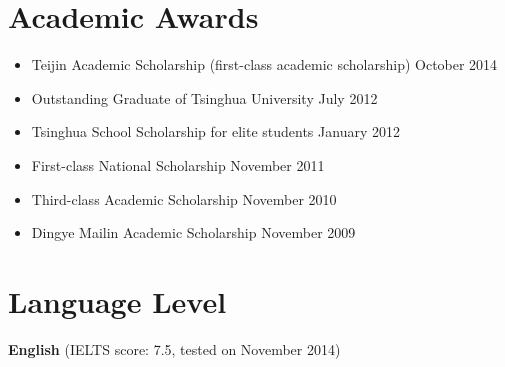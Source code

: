 \documentclass[margin]{res}
\begin{document}
\begin{resume}
\section{Academic Awards}
\begin{itemize}
   \item Teijin Academic Scholarship (first-class academic scholarship) \hfill October 2014
   \item Outstanding Graduate of Tsinghua University \hfill July 2012
   \item Tsinghua School Scholarship for elite students \hfill January 2012
   \item First-class National Scholarship \hfill November 2011
   \item Third-class Academic Scholarship \hfill November 2010
   \item Dingye Mailin Academic Scholarship \hfill November 2009
\end{itemize}

\section{Language Level}
\textbf{English} (IELTS score: 7.5, tested on November 2014)



\end{resume}
\end{document}
